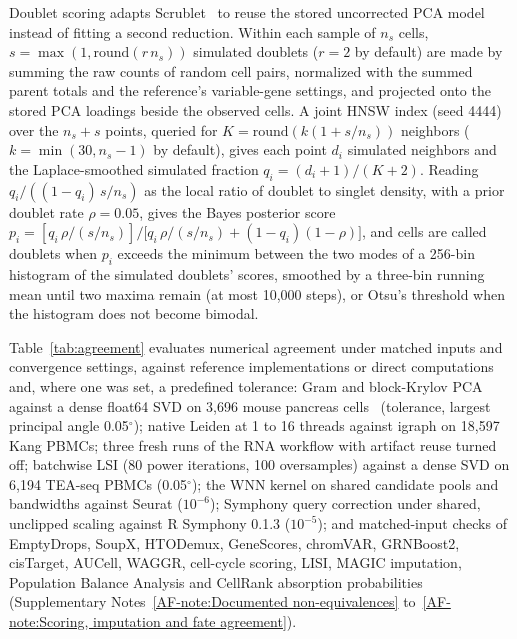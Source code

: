 \documentclass[11pt]{article}
\newcommand{\sref}[1]{\ref*{AF-#1}}
\begin{document}
Doublet scoring adapts Scrublet~\cite{wolock2019scrublet} to reuse the stored uncorrected PCA model instead of fitting a second reduction. Within each sample of $n_s$ cells, $s=\max(1,\mathrm{round}(r\,n_s))$ simulated doublets ($r=2$ by default) are made by summing the raw counts of random cell pairs, normalized with the summed parent totals and the reference's variable-gene settings, and projected onto the stored PCA loadings beside the observed cells. A joint HNSW index (seed 4444) over the $n_s+s$ points, queried for $K=\mathrm{round}(k(1+s/n_s))$ neighbors ($k=\min(30,n_s-1)$ by default), gives each point $d_i$ simulated neighbors and the Laplace-smoothed simulated fraction $q_i=(d_i+1)/(K+2)$. Reading $q_i/((1-q_i)\,s/n_s)$ as the local ratio of doublet to singlet density, with a prior doublet rate $\rho=0.05$, gives the Bayes posterior score $p_i=[q_i\,\rho/(s/n_s)]/\bigl[q_i\,\rho/(s/n_s)+(1-q_i)(1-\rho)\bigr]$, and cells are called doublets when $p_i$ exceeds the minimum between the two modes of a 256-bin histogram of the simulated doublets' scores, smoothed by a three-bin running mean until two maxima remain (at most 10,000 steps), or Otsu's threshold when the histogram does not become bimodal.

Table~\ref{tab:agreement} evaluates numerical agreement under matched inputs and convergence settings, against reference implementations or direct computations and, where one was set, a predefined tolerance: Gram and block-Krylov PCA against a dense float64 SVD on 3,696 mouse pancreas cells~\cite{bastidas2019} (tolerance, largest principal angle 0.05\ensuremath{^{\circ}}); native Leiden at 1 to 16 threads against igraph on 18,597 Kang PBMCs; three fresh runs of the RNA workflow with artifact reuse turned off; batchwise LSI (80 power iterations, 100 oversamples) against a dense SVD on 6,194 TEA-seq PBMCs (0.05\ensuremath{^{\circ}}); the WNN kernel on shared candidate pools and bandwidths against Seurat ($10^{-6}$); Symphony query correction under shared, unclipped scaling against R Symphony 0.1.3 ($10^{-5}$); and matched-input checks of EmptyDrops, SoupX, HTODemux, GeneScores, chromVAR, GRNBoost2, cisTarget, AUCell, WAGGR, cell-cycle scoring, LISI, MAGIC imputation, Population Balance Analysis and CellRank absorption probabilities~\cite{lun2019emptydrops,young2020soupx,stoeckius2018,schep2017chromvar,moerman2018grnboost2,aibar2017scenic,badia2022decoupler,vandijk2018magic,lange2022cellrank} (Supplementary Notes~\sref{note:Documented non-equivalences} to~\sref{note:Scoring, imputation and fate agreement}).
\end{document}
